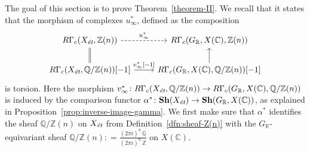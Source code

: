\documentclass{article}
\newcommand{\CC}{\mathbb{C}}
\newcommand{\QQ}{\mathbb{Q}}
\newcommand{\RR}{\mathbb{R}}
\newcommand{\ZZ}{\mathbb{Z}}
\newcommand{\et}{\text{\it ét}}
\newcommand{\dfn}{\mathrel{\mathop:}=}
\theoremstyle{definition}
\numberwithin{equation}{section}
\begin{document}
The goal of this section is to prove Theorem~\ref{theorem-II}. We recall that it
states that the morphism of complexes $u_\infty^*$, defined as the composition
\[ \begin{tikzcd}
  R\Gamma_c (X_\et, \ZZ(n)) \ar[equals]{d}\ar[dashed]{r}{u_\infty^*} & R\Gamma_c (G_\RR, X (\CC), \ZZ (n)) \\
  R\Gamma_c (X_\et, \QQ/\ZZ (n)) [-1] \ar{r}{v_\infty^* [-1]} & R\Gamma_c (G_\RR, X (\CC), \QQ/\ZZ (n)) [-1] \ar{u}
\end{tikzcd} \]
is torsion. Here the morphism
$v_\infty^*\colon R\Gamma_c (X_\et, \QQ/\ZZ (n)) \to R\Gamma_c (G_\RR, X (\CC), \QQ/\ZZ (n))$
is induced by the comparison functor
$\alpha^*\colon \mathbf{Sh} (X_\et) \to \mathbf{Sh} (G_\RR, X (\CC))$, as
explained in Proposition~\ref{prop:inverse-image-gamma}. We first make sure that
$\alpha^*$ identifies the sheaf $\QQ/\ZZ (n)$ on $X_\et$ from
Definition~\ref{dfn:sheaf-Z(n)} with the $G_\RR$-equivariant sheaf
$\QQ/\ZZ (n) \dfn \frac{(2\pi i)^n\,\QQ}{(2\pi i)^n\,\ZZ}$ on $X (\CC)$.
\end{document}
